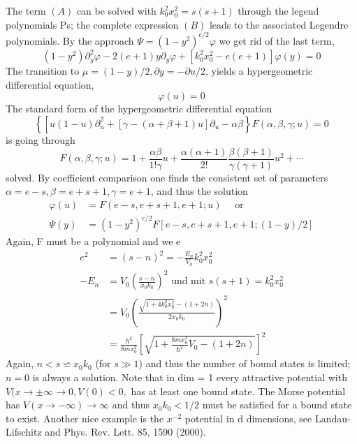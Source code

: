The term $(A)$ can be solved with $k_0^2x_0^2 = s (s + 1)$ through the legend polynomials Ps; the complete expression $(B)$ leads to the associated Legendre polynomials. By the approach $\Psi = (1 - y^2)^{e / 2}\varphi$ we get rid of the last term,
\begin{equation}
    \left(1-y^{2}\right) \partial_{y}^{2} \varphi-2(e+1) y \partial_{y} \varphi+\left[k_{0}^{2} x_{0}^{2}-e(e+1)\right] \varphi(y)=0
    \end{equation}
The transition to $\mu = (1 - y) / 2, \partial y = -\partial u / 2$, yields a hypergeometric differential equation,
\begin{equation}
    [u(1-u) \partial_{u}^{2}+(e+1)(1-2 u) \partial_{u}-\underbrace{(e-s)(e+s+1)}_{e(e+1)-\underbrace{s(s+1)}_{k_{0}^{2} x_{0}^{2}}}] \varphi(u)=0
    \end{equation}
The standard form of the hypergeometric differential equation
\begin{equation}
    \left\{\left[u(1-u) \partial_{u}^{2}+[\gamma-(\alpha+\beta+1) u] \partial_{u}-\alpha \beta\right\} F(\alpha, \beta, \gamma ; u)=0\right.
    \end{equation}
is going through
$$
    F(\alpha, \beta, \gamma ; u)=1+\frac{\alpha \beta}{1 ! \gamma} u+\frac{\alpha(\alpha+1)}{2 !} \frac{\beta(\beta+1)}{\gamma(\gamma+1)} u^{2}+\cdots
$$
solved. By coefficient comparison one finds the consistent set of parameters $\alpha = e - s, \beta = e + s + 1, \gamma = e + 1$, and thus the solution
\begin{equation}
\begin{aligned} \varphi(u) &=F(e-s, e+s+1, e+1 ; u) \quad \text { or } \\ \Psi(y) &=\left(1-y^{2}\right)^{e / 2} F[e-s, e+s+1, e+1 ;(1-y) / 2] \end{aligned}
\end{equation}
Again, F must be a polynomial and we e
\begin{equation}
\begin{aligned} e^{2} &=(s-n)^{2}=-\frac{E_{n}}{V_{0}} k_{0}^{2} x_{0}^{2} \\-E_{n} &=V_{0}\left(\frac{s-n}{x_{0} k_{0}}\right)^{2} \text { und mit } s(s+1)=k_{0}^{2} x_{0}^{2} \\ &=V_{0}\left(\frac{\sqrt{1+4 k_{0}^{2} x_{0}^{2}}-(1+2 n)}{2 x_{0} k_{0}}\right)^{2} \\ &=\frac{\hbar^{2}}{8 m x_{0}^{2}}[\sqrt{1+\frac{8 m x_{0}^{2}}{\hbar^{2}} V_{0}-(1+2 n)}]^{2} \end{aligned}
\end{equation}
Again, $n <s\backsimeq x_0k_0$ (for $s\gg 1$) and thus the number of bound states is limited; $n = 0$ is always a solution. Note that in dim = 1 every attractive potential with $V (x \to\pm\infty\to 0, V (0) <0,$ has at least one bound state. The Morse potential has $V(x\to -\infty)\to\infty$ and thus $x_0k_0 <1/2$ must be satisfied for a bound state to exist. Another nice example is the $x^{-2}$ potential in d dimensions, see Landau-Lifschitz and Phys. Rev. Lett. 85, 1590 (2000).
